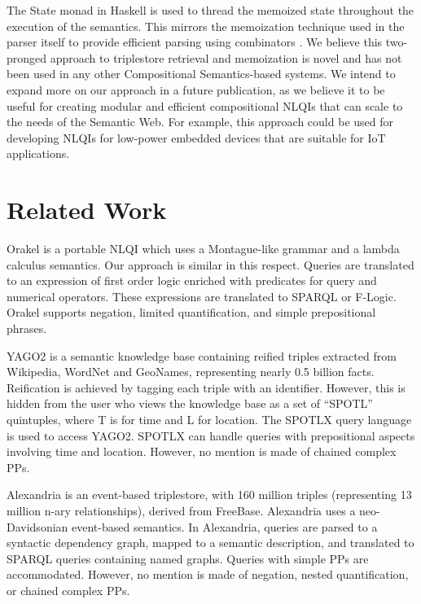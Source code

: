 \documentclass[../main.tex]{subfiles}
\begin{document}
\begin{refsection}
The State monad in Haskell is used to thread the memoized state throughout the execution of the semantics.  This mirrors the memoization technique used in the parser itself to provide efficient parsing using combinators \cite{frosthafiz2008}.
We believe this two-pronged approach to triplestore retrieval and memoization is novel and has not been used in any other Compositional Semantics-based systems.  We intend to expand more on our approach in a future publication, as we believe it to be useful for creating modular and efficient compositional NLQIs that can scale to the needs of the Semantic Web.  For example, this approach could be used for developing NLQIs for low-power embedded devices that are suitable for IoT applications.

\section{Related Work}
\label{webist2019journal:relatedwork}

Orakel \cite{cimiano2007orakel} is a portable NLQI which uses a Montague-like grammar and a lambda calculus semantics. Our approach is similar in this respect. Queries are translated to an expression of first order logic enriched with predicates for query and numerical operators. These
expressions are translated to SPARQL or F-Logic. Orakel supports negation, limited quantification, and simple prepositional phrases.

YAGO2 \cite{hoffart2013yago2} is a semantic knowledge base containing reified triples extracted from Wikipedia, WordNet and GeoNames, representing nearly 0.5 billion facts. Reification is achieved by tagging each triple with an identifier. However, this is hidden from the user who views the knowledge base as a set of ``SPOTL'' quintuples, where T is for time and L for location. The SPOTLX query language is used to access YAGO2. SPOTLX can handle queries with prepositional aspects involving time and location. However, no mention is made of chained complex PPs.

Alexandria \cite{wendt2012linguistic} is an event-based triplestore, with 160 million triples (representing 13 million n-ary relationships), derived from FreeBase. Alexandria uses a neo-Davidsonian \cite{parsons1990events} event-based semantics. In Alexandria, queries are parsed to a syntactic dependency graph, mapped to a semantic description, and translated to SPARQL queries containing named graphs. Queries with simple PPs are accommodated. However, no mention is made of negation, nested quantification, or chained complex PPs.


\end{refsection}
\end{document}
